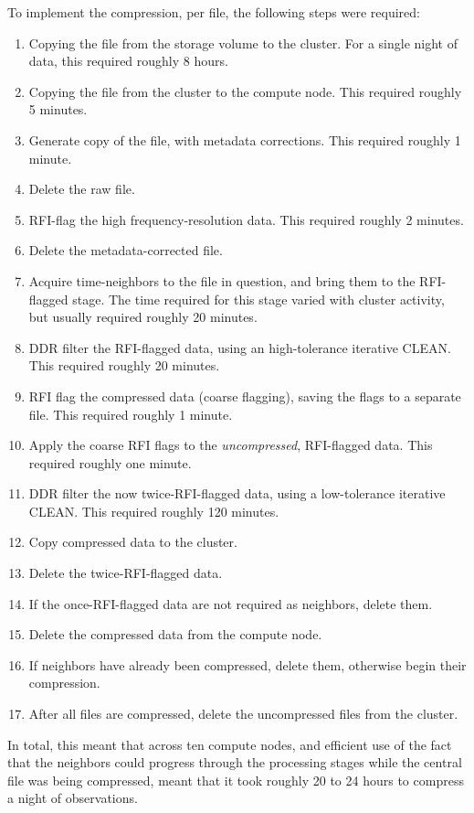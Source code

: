 To implement the compression, per file, the following steps were required:

\begin{enumerate}
\item Copying the file from the storage volume to the cluster. For a single night of data, this required roughly 8 hours.
\item Copying the file from the cluster to the compute node. This required roughly 5 minutes.
\item Generate copy of the file, with metadata corrections. This required roughly 1 minute.
\item Delete the raw file.
\item RFI-flag the high frequency-resolution data. This required roughly 2 minutes.
\item Delete the metadata-corrected file.
\item Acquire time-neighbors to the file in question, and bring them to the RFI-flagged stage. The time required for this stage varied with cluster activity, but usually required roughly 20 minutes.
\item DDR filter the RFI-flagged data, using an high-tolerance iterative CLEAN. This required roughly 20 minutes.
\item RFI flag the compressed data (coarse flagging), saving the flags to a separate file. This required roughly 1 minute.
\item Apply the coarse RFI flags to the \textit{uncompressed}, RFI-flagged data. This required roughly one minute.
\item DDR filter the now twice-RFI-flagged data, using a low-tolerance iterative CLEAN. This required roughly 120 minutes.
\item Copy compressed data to the cluster.
\item Delete the twice-RFI-flagged data.
\item If the once-RFI-flagged data are not required as neighbors, delete them.
\item Delete the compressed data from the compute node.
\item If neighbors have already been compressed, delete them, otherwise begin their compression.
\item After all files are compressed, delete the uncompressed files from the cluster.
\end{enumerate}

In total, this meant that across ten compute nodes, and efficient use of the fact that the neighbors could progress through the processing stages while the central file was being compressed, meant that it took roughly 20 to 24 hours to compress a night of observations. 

